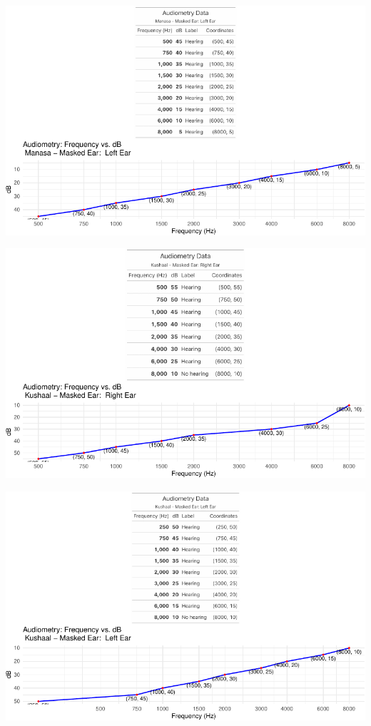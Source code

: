 \documentclass[
  11pt,
  letterpaper,
  DIV=11,
  numbers=noendperiod]{scrreprt}
\begin{document}
\includegraphics{audiometry_files/figure-pdf/unnamed-chunk-2-1.pdf}

\includegraphics{audiometry_files/figure-pdf/unnamed-chunk-3-1.pdf}

\includegraphics{audiometry_files/figure-pdf/unnamed-chunk-4-1.pdf}
\end{document}
